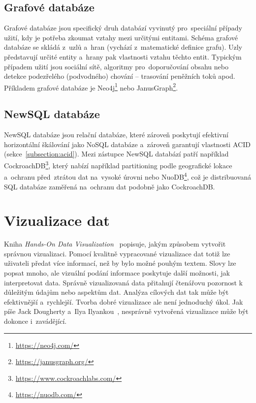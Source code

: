 \subsection{Grafové databáze}
\label{subsection:graph_databases}
Grafové databáze jsou specifický druh databází vyvinutý pro~speciální případy užití, kdy je potřeba zkoumat vztahy
mezi určitými entitami. Schéma grafové databáze se skládá z~uzlů a~hran (vychází z~matematické definice grafu). Uzly
představují určité entity a~hrany pak vlastnosti vztahu těchto entit. Typickým případem užití jsou sociální sítě,
algoritmy pro~doporučování obsahu nebo detekce podezřelého (podvodného) chování -- trasování peněžních toků apod.
Příkladem grafové databáze je Neo4j\footnote{\href{https://neo4j.com/}{https://neo4j.com/}} nebo JanusGraph\footnote{\href{https://janusgraph.org/}{https://janusgraph.org/}}.~\cite{NoSQLExplained}

\subsection{NewSQL databáze}
\label{section:newsql_databaze}
NewSQL databáze jsou relační databáze, které zároveň poskytují efektivní horizontální škálování jako NoSQL databáze
a~zároveň garantují vlastnosti ACID (sekce~\ref{subsection:acid}). Mezi zástupce NewSQL databází patří například
CockroachDB\footnote{\href{https://www.cockroachlabs.com/}{https://www.cockroachlabs.com/}}, který nabízí například
partitioning podle geografické lokace a~ochranu před~ztrátou dat na~vysoké úrovni nebo NuoDB\footnote{\href{https://nuodb.com/}{https://nuodb.com/}}, což je distribuovaná SQL databáze zaměřená na~ochranu dat podobně jako CockroachDB.

\section{Vizualizace dat}
\label{section:vizualizace_dat}
Kniha \textit{Hands-On Data Visualization}~\cite{HandsOnDataVisualization} popisuje, jakým způsobem vytvořit
správnou vizualizaci. Pomocí kvalitně vypracované vizualizace dat totiž lze uživateli předat více informací, než by
bylo možné pouhým textem. Slovy lze popsat mnoho, ale vizuální podání informace poskytuje další možnosti, jak
interpretovat data. Správně vizualizovaná data přitahují čtenářovu pozornost k důležitým údajům nebo aspektům dat.
Analýza cílových dat tak může být efektivnější a~rychlejší. Tvorba dobré vizualizace ale není jednoduchý úkol. Jak
píše Jack Dougherty a~Ilya Ilyankou~\cite{HandsOnDataVisualization}, nesprávně vytvořená vizualizace může být
dokonce i~zavádějící.


